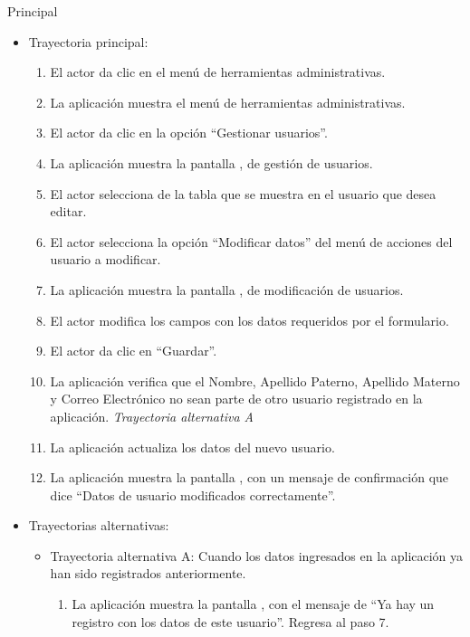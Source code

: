 \begin{UCtrayectoria}{Principal}
			\begin{itemize}
				\item Trayectoria principal:
					\begin{enumerate}
						\item El actor da clic en el menú de herramientas administrativas.
						\item La aplicación muestra el menú de herramientas administrativas.
						\item El actor da clic en la opción ``Gestionar usuarios''.
						\item La aplicación muestra la pantalla , de gestión de usuarios.
						\item El actor selecciona de la tabla que se muestra en  el usuario que desea editar.
						\item El actor selecciona la opción ``Modificar datos'' del menú de acciones del usuario a modificar.
						\item La aplicación muestra la pantalla , de modificación de usuarios.
						\item El actor modifica los campos con los datos requeridos por el formulario.
						\item El actor da clic en ``Guardar''.
						\item La aplicación verifica que el Nombre, Apellido Paterno, Apellido Materno y Correo Electrónico no sean parte de otro usuario registrado en la aplicación. \textsl{Trayectoria alternativa A}
						\item La aplicación actualiza los datos del nuevo usuario.
						\item La aplicación muestra la pantalla , con un mensaje de confirmación que dice ``Datos de usuario modificados correctamente''.
					\end{enumerate}
				\item Trayectorias alternativas:
					\begin{itemize}
						\item Trayectoria alternativa A: Cuando los datos ingresados en la aplicación ya han sido registrados anteriormente.
							\begin{enumerate}
								\item La aplicación muestra la pantalla , con el mensaje de ``Ya hay un registro con los datos de este usuario''. Regresa al paso 7.
							\end{enumerate}
					\end{itemize}
			\end{itemize}
			

\end{UCtrayectoria}
